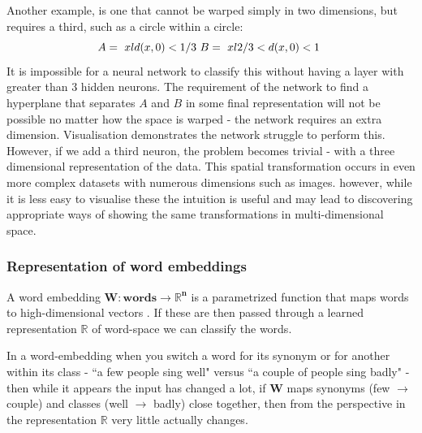 \documentclass[a4paper,11pt,titlepage]{article}
\begin{document}
 		
		Another example, is one that cannot be warped simply in two dimensions, but requires a third, such as a circle within a circle:
		$$ 
		A = \text{ $ { xld(x,0) < 1/3 } $ }		
		B = \text{ $ { xl2/3 < d(x,0) < 1 } $ }
		$$ 
		It is impossible for a neural network to classify this without having a layer with greater than 3 hidden neurons. The requirement of the network to find a hyperplane that separates $ A $ and $ B $ in some final representation will not be possible no matter how the space is warped - the network requires an extra dimension. Visualisation demonstrates the network struggle to perform this. However, if we add a third  neuron, the problem becomes trivial - with a three dimensional representation of the data. This spatial transformation occurs in even more complex datasets with numerous dimensions \cite{Carlsson2008} such as images. however, while it is less easy to visualise these the intuition is useful and may lead to discovering appropriate ways of showing the same transformations in multi-dimensional space.
		\par 

		\subsubsection{Representation of word embeddings}
 		
 		 \begin{figure}[H]
    			\caption{}%
    			\label{fig:pca}
		\end{figure}
		
 		
		A word embedding $ \bm{W : words \rightarrow \mathbb{R}^{n}} $ is a parametrized function that maps words to high-dimensional vectors \cite{Bengio2003}. If these are then passed through a learned representation $ \mathbb{R} $ of word-space we can classify the words.  		
		\par 
		In a word-embedding when you switch a word for its synonym or for another within its class - ``a few people sing well" versus ``a couple of people sing badly" - then while it appears the input has changed a lot, if $ \bm{W} $ maps synonyms (few $\rightarrow$ couple) and classes (well $\rightarrow$ badly) close together, then from the perspective in the representation $ \mathbb{R} $ very little actually changes.
		\par 
\end{document}
